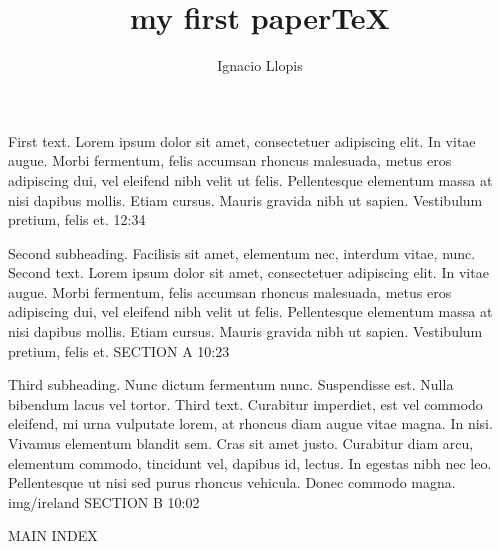 \documentclass[10pt,final,hyphenatedtitles]{papertex}
\author{Ignacio Llopis}
\title{my first paperTeX}
\begin{document}

\begin{frontpage}

						{First text. Lorem ipsum dolor sit amet, consectetuer adipiscing elit. In vitae augue. Morbi fermentum, felis accumsan rhoncus malesuada, metus eros adipiscing dui, vel eleifend nibh velit ut felis. Pellentesque elementum massa at nisi dapibus mollis. Etiam cursus. Mauris gravida nibh ut sapien. Vestibulum pretium, felis et.}%
						{12:34}

%
						{Second subheading. Facilisis sit amet, elementum nec, interdum vitae, nunc.}%
						{Second text. Lorem ipsum dolor sit amet, consectetuer adipiscing elit. In vitae augue. Morbi fermentum, felis accumsan rhoncus malesuada, metus eros adipiscing dui, vel eleifend nibh velit ut felis. Pellentesque elementum massa at nisi dapibus mollis. Etiam cursus. Mauris gravida nibh ut sapien. Vestibulum pretium, felis et.}%
						{SECTION A}%
						{10:23}

%
					{Third subheading. Nunc dictum fermentum nunc. Suspendisse est. Nulla bibendum lacus vel tortor.}%
					{Third text. Curabitur imperdiet, est vel commodo eleifend, mi urna vulputate lorem, at rhoncus diam augue vitae magna. In nisi. Vivamus elementum blandit sem. Cras sit amet justo. Curabitur diam arcu, elementum commodo, tincidunt vel, dapibus id, lectus. In egestas nibh nec leo. Pellentesque ut nisi sed purus rhoncus vehicula. Donec commodo magna.}%
					{img/ireland}%
					{SECTION B}%
					{10:02}

\begin{indexblock}{MAIN INDEX}




\end{indexblock}
\end{frontpage}
\end{document}
